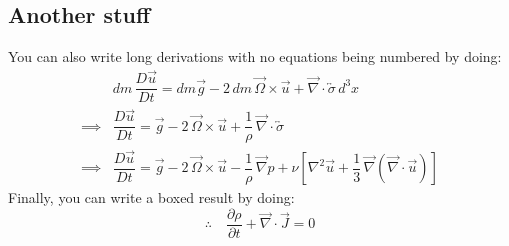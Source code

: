 \subsection{Another stuff}
You can also write long derivations with no equations being numbered by doing:
\begin{align*}
    & dm \, \dfrac{D \vec{u}}{Dt} = dm \vec{g} - 2 \, dm \, \vec{\Omega} \times \vec{u} + \vec{\nabla} \cdot \overleftrightarrow{\sigma} \, d^3x \\
    \implies & \dfrac{D \vec{u}}{Dt} = \vec{g} - 2 \, \vec{\Omega} \times \vec{u} + \dfrac{1}{\rho} \, \vec{\nabla} \cdot \overleftrightarrow{\sigma} \\
    \implies & \dfrac{D \vec{u}}{Dt} = \vec{g} - 2 \, \vec{\Omega} \times \vec{u} - \dfrac{1}{\rho} \, \vec{\nabla} p + \nu \left[ \nabla^2 \vec{u} + \dfrac{1}{3} \, \vec{\nabla} (\vec{\nabla} \cdot \vec{u}) \right]
\end{align*}
Finally, you can write a boxed result by doing:
\begin{equation}
    \therefore \quad \boxed{\dfrac{\partial \rho}{\partial t} + \vec{\nabla} \cdot \vec{J} = 0}
\end{equation}